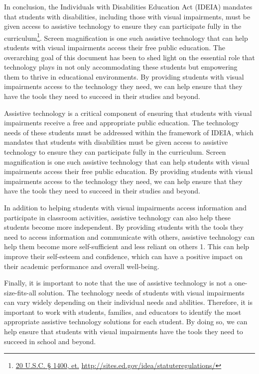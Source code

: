 \documentclass[12pt,letterpaper,twoside,openright]{report}
\begin{document}
In conclusion, the Individuals with Disabilities Education Act (IDEIA) mandates that students with disabilities, including those with visual impairments, must be given access to assistive technology to ensure they can participate fully in the curriculum\footnote{\raggedright \href{http://sites.ed.gov/idea/statuteregulations/}{20 U.S.C. § 1400, et.} \url{http://sites.ed.gov/idea/statuteregulations/}}. Screen magnification is one such assistive technology that can help students with visual impairments access their free public education. The overarching goal of this document has been  to shed light on the essential role that technology plays in not only accommodating these students but empowering them to thrive in educational environments. By providing students with visual impairments access to the technology they need, we can help ensure that they have the tools they need to succeed in their studies and beyond.

Assistive technology is a critical component of ensuring that students with visual impairments receive a free and appropriate public education. The technology needs of these students must be addressed within the framework of IDEIA, which mandates that students with disabilities must be given access to assistive technology to ensure they can participate fully in the curriculum. Screen magnification is one such assistive technology that can help students with visual impairments access their free public education. By providing students with visual impairments access to the technology they need, we can help ensure that they have the tools they need to succeed in their studies and beyond.

In addition to helping students with visual impairments access information and participate in classroom activities, assistive technology can also help these students become more independent. By providing students with the tools they need to access information and communicate with others, assistive technology can help them become more self-sufficient and less reliant on others 1. This can help improve their self-esteem and confidence, which can have a positive impact on their academic performance and overall well-being.

Finally, it is important to note that the use of assistive technology is not a one-size-fits-all solution. The technology needs of students with visual impairments can vary widely depending on their individual needs and abilities. Therefore, it is important to work with students, families, and educators to identify the most appropriate assistive technology solutions for each student. By doing so, we can help ensure that students with visual impairments have the tools they need to succeed in school and beyond.
\end{document}
